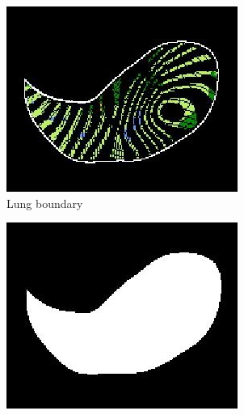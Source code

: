 \begin{figure}[htbp]
\begin{subfigure}{.28\linewidth}
  \includegraphics[width=\linewidth,trim={{.0\wd0} {.0\wd0} {.0\wd0} {.0\wd0}},clip]{QuantitativeAnalysis/Image/GapFilling2.jpg}
  \caption{Lung boundary\\ \quad}
  \label{fig:GapFilling-b} 
\end{subfigure}
\hspace{.5in}
\begin{subfigure}{.28\linewidth}%
  \includegraphics[width=\linewidth,trim={{.0\wd0} {.0\wd0} {.0\wd0} {.0\wd0}},clip]{QuantitativeAnalysis/Image/GapFilling3.jpg}

\end{subfigure}
\end{figure}
